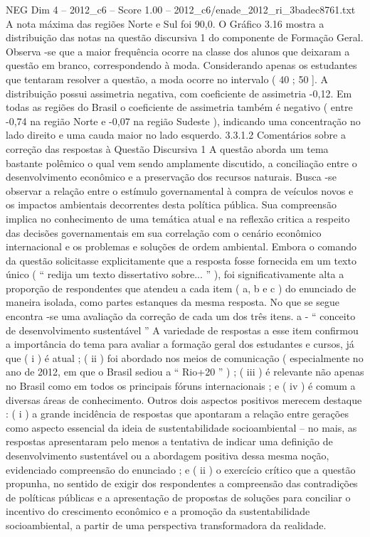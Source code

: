 \begin{textsample}{NEG Dim 4 – 2012\_c6 – Score 1.00 – 2012\_c6/enade\_2012\_ri\_3badec8761.txt}
A nota máxima das regiões Norte e Sul foi 90,0.
O Gráfico 3.16 mostra a distribuição das notas na questão discursiva 1 do componente de Formação Geral.
Observa -se que a maior frequência ocorre na classe dos alunos que deixaram a questão em branco, correspondendo à moda.
Considerando apenas os estudantes que tentaram resolver a questão, a moda ocorre no intervalo ( 40 ; 50 ].
A distribuição possui assimetria negativa, com coeficiente de assimetria -0,12.
Em todas as regiões do Brasil o coeficiente de assimetria também é negativo ( entre -0,74 na região Norte e -0,07 na região Sudeste ), indicando uma concentração no lado direito e uma cauda maior no lado esquerdo. 3.3.1.2 Comentários sobre a correção das respostas à Questão Discursiva 1 A questão aborda um tema bastante polêmico o qual vem sendo amplamente discutido, a conciliação entre o desenvolvimento econômico e a preservação dos recursos naturais.
Busca -se observar a relação entre o estímulo governamental à compra de veículos novos e os impactos ambientais decorrentes desta política pública.
Sua compreensão implica no conhecimento de uma temática atual e na reflexão critica a respeito das decisões governamentais em sua correlação com o cenário econômico internacional e os problemas e soluções de ordem ambiental.
Embora o comando da questão solicitasse explicitamente que a resposta fosse fornecida em um texto único ( “ redija um texto dissertativo sobre... ” ), foi significativamente alta a proporção de respondentes que atendeu a cada item ( a, b e c ) do enunciado de maneira isolada, como partes estanques da mesma resposta.
No que se segue encontra -se uma avaliação da correção de cada um dos três itens. a - “ conceito de desenvolvimento sustentável ” A variedade de respostas a esse item confirmou a importância do tema para avaliar a formação geral dos estudantes e cursos, já que ( i ) é atual ; ( ii ) foi abordado nos meios de comunicação ( especialmente no ano de 2012, em que o Brasil sediou a “ Rio+20 ” ) ; ( iii ) é relevante não apenas no Brasil como em todos os principais fóruns internacionais ; e ( iv ) é comum a diversas áreas de conhecimento.
Outros dois aspectos positivos merecem destaque : ( i ) a grande incidência de respostas que apontaram a relação entre gerações como aspecto essencial da ideia de sustentabilidade socioambiental – no mais, as respostas apresentaram pelo menos a tentativa de indicar uma definição de desenvolvimento sustentável ou a abordagem positiva dessa mesma noção, evidenciado compreensão do enunciado ; e ( ii ) o exercício crítico que a questão propunha, no sentido de exigir dos respondentes a compreensão das contradições de políticas públicas e a apresentação de propostas de soluções para conciliar o incentivo do crescimento econômico e a promoção da sustentabilidade socioambiental, a partir de uma perspectiva transformadora da realidade.

\end{textsample}
